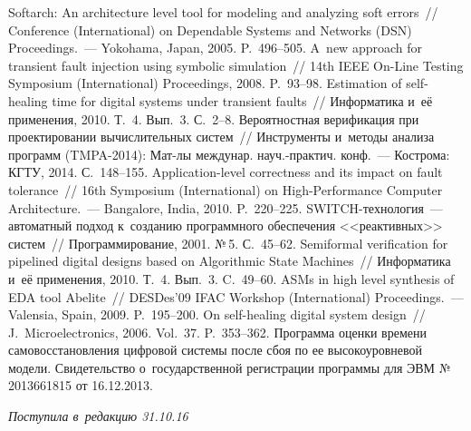 \begin{multicols}{2}
{{\begin{thebibliography}{99}
 Softarch: An architecture level tool for modeling 
and analyzing soft errors~//  Conference (International) on Dependable Systems and Networks 
(DSN) Proceedings.~--- Yokohama, Japan, 2005. P.~496--505.
 A~new approach for transient fault 
injection using symbolic simulation~// 14th IEEE On-Line Testing Symposium 
(International) Proceedings, 2008. P.~93--98.
 Estimation of self-healing time for digital systems under transient 
faults~// Информатика и~её применения, 2010. Т.~4. Вып.~3. С.~2--8. 
 Вероятностная верификация при 
проектировании вычислительных сис\-тем~// Инструменты и~методы анализа программ 
(TMPA-2014): Мат-лы междунар. науч.-практич. конф.~--- Кострома: КГТУ, 2014.  
С.~148--155.
 Application-level correctness and its impact on fault tolerance~//  16th 
Symposium (International) on High-Performance Computer Architecture.~--- Bangalore, India, 
2010. P.~220--225.
 SWITCH-тех\-но\-ло\-гия~--- автоматный подход 
к~созданию программного обеспечения <<реактивных>> сис\-тем~// Программирование, 
2001. №\,5. С.~45--62.
 Semiformal verification for pipelined digital designs 
based on Algorithmic State Machines~// Информатика и~её применения, 2010. Т.~4. Вып.~3. 
C.~49--60.
 ASMs in high level synthesis of EDA tool Abelite~// DESDes'09 IFAC 
Workshop (International) Proceedings.~--- Valensia, Spain, 2009. P.~195--200.
 On self-healing digital system design~// J.~Microelectronics, 
2006. Vol.~37. P.~353--362.
 Программа оценки времени самовосстановления 
цифровой системы после сбоя по ее высокоуровневой модели. Свидетельство 
о~государственной регистрации программы для ЭВМ №\,2013661815 от 16.12.2013.

 \end{thebibliography}

 }
 }

\end{multicols}

\vspace*{-3pt}

\hfill{\small\textit{Поступила в~редакцию 31.10.16}}

